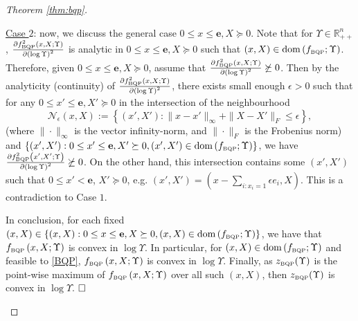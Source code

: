 \documentclass[smallextended]{svjour3hack}       %
\DeclareMathOperator{\dom}{dom}
\begin{document}
\begin{proof}[Theorem \ref{thm:bqp}]
\begin{itemize}
    \smallskip
    \underline{Case $2$}: now, we discuss the general case $0\le x \le \mathbf{e}, X\succeq 0$. Note that for $\Upsilon \in \mathbb{R}^n_{++}$, $\frac{\partial f^2_{{\tiny\mbox{BQP}}}\left(x,X;\Upsilon\right)}{\partial \left(\log \Upsilon\right)^2}$ is analytic in $0\le x \le \mathbf{e}, X \succeq 0$ such that $(x,X) \in \dom\left(f_{{\tiny\mbox{BQP}}};\Upsilon\right)$.  Therefore, given $0\le x \le \mathbf{e}, X \succeq 0$, assume that $\frac{\partial f^2_{{\tiny\mbox{BQP}}}\left(x,X;\Upsilon\right)}{\partial \left(\log \Upsilon\right)^2}\not \succeq 0$. Then by the analyticity (continuity) of $\frac{\partial f^2_{{\tiny\mbox{BQP}}}\left(x,X;\Upsilon\right)}{\partial \left(\log \Upsilon\right)^2}$, there exists small enough $\epsilon>0$ such that {for any $0\le x' \le \mathbf{e}, X' \succeq 0$ in the intersection of the neighbourhood
    \[
    \mathcal{N}_\epsilon(x,X):= \left\{(x',X'): \|x-x'\|_{\infty}+ \|X-X'\|_F\le \epsilon\right\},
    \]
    (where $\|\cdot\|_{\infty}$ is the vector infinity-norm, and $\|\cdot\|_F$ is the Frobenius norm) and $\{(x',X'): 0\le x' \le \mathbf{e}, X' \succeq 0, (x',X') \in \dom\left(f_{{\tiny\mbox{BQP}}};\Upsilon\right)\}$, we have $\frac{\partial f^2_{{\tiny\mbox{BQP}}}\left(x',X';\Upsilon\right)}{\partial \left(\log \Upsilon\right)^2} \not \succeq 0$.} On the other hand, this intersection contains some $(x',X')$ such that $0\le x'<\mathbf{e}$, $X'\succeq 0$, e.g. $(x',X')=(x-\sum_{i:x_i=1} \epsilon e_i, X)$. This is a contradiction to Case $1$.   \smallskip

   In conclusion, for each fixed $(x,X)\in \{(x,X): 0\le x \le \mathbf{e}, X \succeq 0, (x,X) \in \dom\left(f_{{\tiny\mbox{BQP}}};\Upsilon\right)\}$, we have that $f_{{\tiny\mbox{BQP}}}\left(x,X;\Upsilon\right)$ is convex in $\log \Upsilon$. In particular, for $(x,X)\in \dom\left(f_{{\tiny\mbox{BQP}}};\Upsilon\right)$ and feasible to \ref{BQP}, $f_{{\tiny\mbox{BQP}}}\left(x,X;\Upsilon\right)$ is convex in $\log \Upsilon$. Finally, as $z_{{\tiny\mbox{BQP}}}(\Upsilon)$ is the point-wise maximum of $f_{{\tiny\mbox{BQP}}}\left(x,X;\Upsilon\right)$ over all such $(x,X)$, then $z_{{\tiny\mbox{BQP}}}(\Upsilon)$ is convex in $\log \Upsilon$. $\hfill \square$



\end{itemize}
\end{proof}
\end{document}
